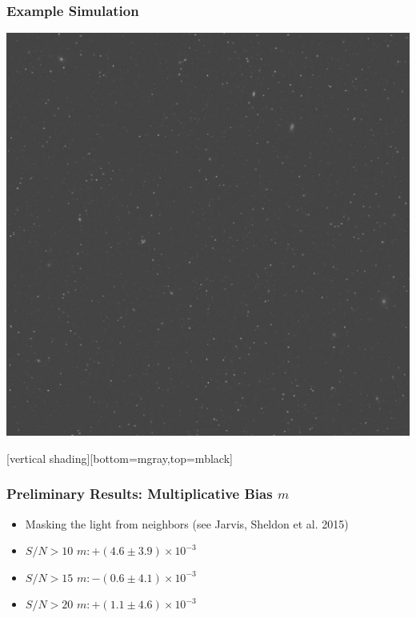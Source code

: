 \documentclass{beamer}
\begin{document}
{

    \frame
    {
        \frametitle{Example Simulation}
     
        \begin{center}
            \includegraphics[width=2.5\textwidth]{nbrsim-003e-000023-image.jpg}
            \newline
        \end{center}

    }
    [vertical shading][bottom=mgray,top=mblack]

}


\frame
{
    \frametitle{Preliminary Results: Multiplicative Bias $m$}

 
    \begin{itemize}

        \item Masking the light from neighbors (see Jarvis, Sheldon et al. 2015)

        \item $S/N > 10$ $m: +(4.6 \pm 3.9) \times 10^{-3}$

        \item $S/N > 15$ $m: -(0.6 \pm 4.1) \times 10^{-3}$

        \item $S/N > 20$ $m: +(1.1 \pm 4.6) \times 10^{-3}$

    \end{itemize}

}
\end{document}
